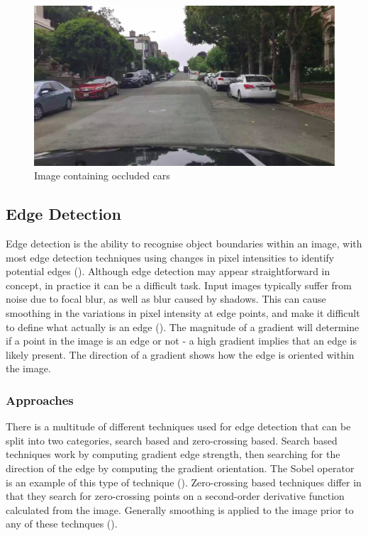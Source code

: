 \documentclass[12pt]{report}
\begin{document}
\vspace{0.5cm}
\begin{figure}[ht!]
	\centering
	\includegraphics[width=12cm]{occlusion}
	\caption{Image containing occluded cars}
	\label{fig:occlusion}
\end{figure}

\newpage
\subsection{Edge Detection}
\begin{flushleft}
Edge detection is the ability to recognise object boundaries within an image, with most edge detection techniques using changes in pixel intensities to identify potential edges (\cite{arbelaez2011contour}). Although edge detection may appear straightforward in concept, in practice it can be a difficult task. Input images typically suffer from noise due to focal blur, as well as blur caused by shadows. This can cause smoothing in the variations in pixel intensity at edge points, and make it difficult to define what actually is an edge (\cite{ziou1998edge}). The magnitude of a gradient will determine if a point in the image is an edge or not - a high gradient implies that an edge is likely present. The direction of a gradient shows how the edge is oriented within the image.
\end{flushleft}

\subsubsection{Approaches}
\begin{flushleft}
There is a multitude of different techniques used for edge detection that can be split into two categories, search based and zero-crossing based. Search based techniques work by computing gradient edge strength, then searching for the direction of the edge by computing the gradient orientation. The Sobel operator is an example of this type of technique (\cite{gupta2013sobel}). Zero-crossing based techniques differ in that they search for zero-crossing points on a second-order derivative function calculated from the image. Generally smoothing is applied to the image prior to any of these technques (\cite{ziou1998edge}).
\end{flushleft}
\end{document}
